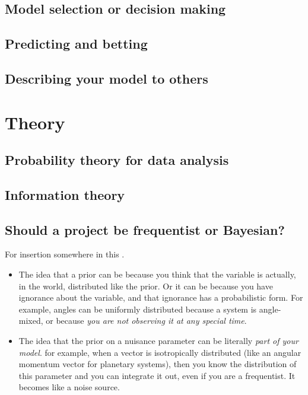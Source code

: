 \documentclass[10pt]{book}
\begin{document}
\chapter{Model selection or decision making}

\chapter{Predicting and betting}

\chapter{Describing your model to others}\label{ch:notation}

\part{Theory}

\chapter{Probability theory for data analysis}

\chapter{Information theory}

\chapter{Should a project be frequentist or Bayesian?}
For insertion somewhere in this \chaptername.
\begin{itemize}
\item The idea that a prior can be because you think that the variable is actually, in the world, distributed like the prior.
Or it can be because you have ignorance about the variable, and that ignorance has a probabilistic form.
For example, angles can be uniformly distributed because a system is angle-mixed, or because \emph{you are not observing it at any special time}.
\item The idea that the prior on a nuisance parameter can be literally \emph{part of your model}. for example, when a vector is isotropically distributed (like an angular momentum vector for planetary systems), then you know the distribution of this parameter and you can integrate it out, even if you are a frequentist.
It becomes like a noise source.
\end{itemize}
\end{document}
